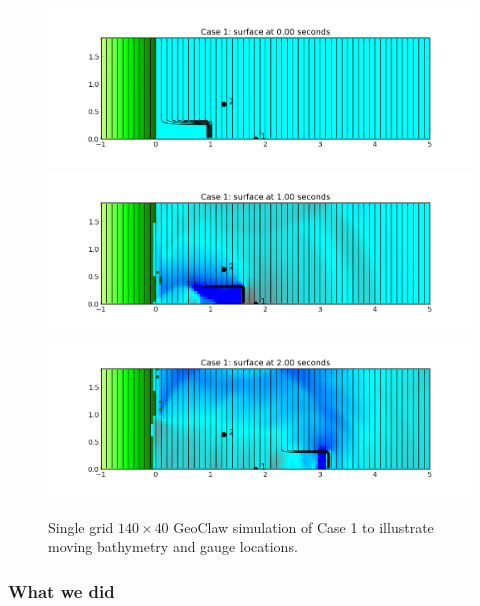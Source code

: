 \begin{figure}[ht]
\includegraphics[width=5 in]{bp8a/frame0.png}
\vskip 10pt
\includegraphics[width=5 in]{bp8a/frame2.png}
\vskip 10pt
\includegraphics[width=5 in]{bp8a/frame4.png}
\caption{\label{fig:bp8pcolor1}
Single grid $140\times 40$ GeoClaw simulation of Case 1 
to illustrate moving bathymetry and gauge locations.
  }
\end{figure}


\subsubsection{What we did}

